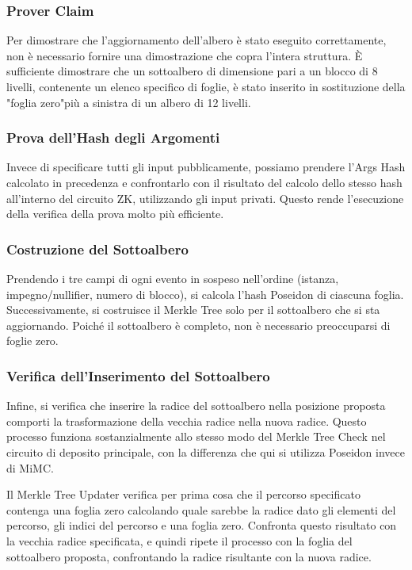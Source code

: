 \subsubsection{Prover Claim}

Per dimostrare che l'aggiornamento dell'albero è stato eseguito correttamente, non è necessario fornire una dimostrazione che copra l'intera struttura. È sufficiente dimostrare che un sottoalbero di dimensione pari a un blocco di 8 livelli, contenente un elenco specifico di foglie, è stato inserito in sostituzione della "foglia zero"più a sinistra di un albero di 12 livelli.

\subsubsection{Prova dell'Hash degli Argomenti}

Invece di specificare tutti gli input pubblicamente, possiamo prendere l'Args Hash calcolato in precedenza e confrontarlo con il risultato del calcolo dello stesso hash all'interno del circuito ZK, utilizzando gli input privati. Questo rende l'esecuzione della verifica della prova molto più efficiente.

\subsubsection{Costruzione del Sottoalbero}

Prendendo i tre campi di ogni evento in sospeso nell'ordine (istanza, impegno/nullifier, numero di blocco), si calcola l'hash Poseidon di ciascuna foglia. Successivamente, si costruisce il Merkle Tree solo per il sottoalbero che si sta aggiornando. Poiché il sottoalbero è completo, non è necessario preoccuparsi di foglie zero.

\subsubsection{Verifica dell'Inserimento del Sottoalbero}

Infine, si verifica che inserire la radice del sottoalbero nella posizione proposta comporti la trasformazione della vecchia radice nella nuova radice. Questo processo funziona sostanzialmente allo stesso modo del Merkle Tree Check nel circuito di deposito principale, con la differenza che qui si utilizza Poseidon invece di MiMC.

Il Merkle Tree Updater verifica per prima cosa che il percorso specificato contenga una foglia zero calcolando quale sarebbe la radice dato gli elementi del percorso, gli indici del percorso e una foglia zero. Confronta questo risultato con la vecchia radice specificata, e quindi ripete il processo con la foglia del sottoalbero proposta, confrontando la radice risultante con la nuova radice.


